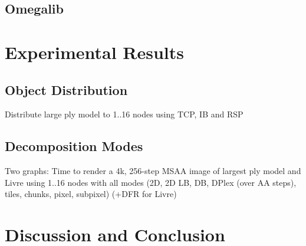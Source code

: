\documentclass[journal]{vgtc}                %
\begin{document}
\subsection{Omegalib}

\section{Experimental Results}
\label{SEC_results}

\subsection{Object Distribution}

Distribute large ply model to 1..16 nodes using TCP, IB and RSP

\subsection{Decomposition Modes}

Two graphs: Time to render a 4k, 256-step MSAA image of largest ply model and
Livre using 1..16 nodes with all modes (2D, 2D LB, DB, DPlex (over AA steps),
tiles, chunks, pixel, subpixel) (+DFR for Livre)

\section{Discussion and Conclusion}
\label{SEC_conclusions}



\vspace{-2mm}
\footnotesize


\end{document}
